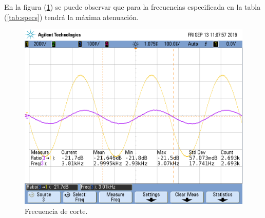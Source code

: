 \documentclass[a4paper]{article}
\begin{document}
En la figura (\ref{fig:fcbr}) se puede observar que para la frecuencias especificada en la tabla (\ref{tab:specs}) tendrá la máxima atenuación.
\begin{figure}[H]	
	\centering
	\includegraphics[width=\textwidth]{ImagenesEj2/MedicionesGrilla/fc_br.png}
	\caption{Frecuencia de corte.}
	\label{fig:fcbr}
\end{figure}
\newpage
\end{document}

